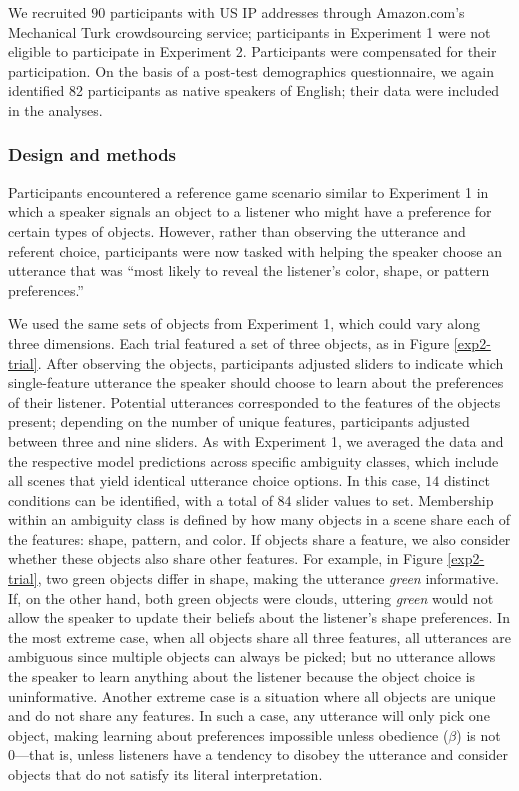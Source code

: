 \documentclass[10pt,a4paper]{article}
\begin{document}
We recruited $90$ participants with US IP addresses through Amazon.com's Mechanical Turk crowdsourcing service; participants in Experiment 1 were not eligible to participate in Experiment 2. Participants were compensated for their participation. On the basis of a post-test demographics questionnaire, we again identified  82 participants as native speakers of English; their data were included in the analyses.

\subsubsection*{Design and methods}

Participants encountered a reference game scenario similar to Experiment 1 in which a speaker signals an object to a listener who might have a preference for certain types of objects. However, rather than observing the utterance and referent choice, participants were now tasked with helping the speaker choose an utterance that was ``most likely to reveal the listener's color, shape, or pattern preferences.''

We used the same sets of objects from Experiment 1, which could vary along three dimensions. Each trial featured a set of three objects, as in Figure \ref{exp2-trial}. After observing the objects, participants adjusted sliders to indicate which single-feature utterance the speaker should choose to learn about the preferences of their listener. Potential utterances corresponded to the features of the objects present; depending on the number of unique features, participants adjusted between three and nine sliders. As with Experiment 1, we averaged the data and the respective model predictions across specific ambiguity classes, which include all scenes that yield identical utterance choice options. 
In this case, $14$ distinct conditions can be identified, with a total of $84$ slider values to set. 
Membership within an ambiguity class is defined by how many objects in a scene share each of the features: shape, pattern, and color. If objects share a feature, we also consider whether these objects also share other features. For example, in Figure \ref{exp2-trial}, two green objects differ in shape, making the utterance \textit{green} informative. If, on the other hand, both green objects were clouds, uttering \textit{green} would not allow the speaker to update their beliefs about the listener's shape preferences.
In the most extreme case, when all objects share all three features, all utterances are ambiguous since multiple objects can always be picked; but no utterance allows the speaker to learn anything about the listener because the object choice is uninformative. Another extreme case is a situation where all objects are unique and do not share any features. In such a case, any utterance will only pick one object, making learning about preferences impossible unless obedience ($\beta$) is not 0---that is, unless listeners have a tendency to disobey the utterance and consider objects that do not satisfy its literal interpretation.
\end{document}
